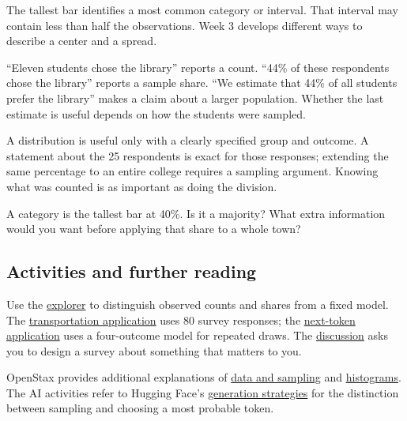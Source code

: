\documentclass[12pt,letterpaper]{article}
\begin{document}
The tallest bar identifies a most common category or interval. That interval may contain less than half the observations. Week 3 develops different ways to describe a center and a spread.


\begin{tcolorbox}[title={What a survey result tells us},breakable,colback=warm,colbacktitle=warm,coltitle=gold,colframe=gold!35]

``Eleven students chose the library'' reports a count. ``44\% of these respondents chose the library'' reports a sample share. ``We estimate that 44\% of all students prefer the library'' makes a claim about a larger population. Whether the last estimate is useful depends on how the students were sampled.


\end{tcolorbox}

A distribution is useful only with a clearly specified group and outcome. A statement about the 25 respondents is exact for those responses; extending the same percentage to an entire college requires a sampling argument. Knowing what was counted is as important as doing the division.


\begin{tcolorbox}[title={Pause and try 12},breakable]
A category is the tallest bar at 40\%. Is it a majority? What extra information would you want before applying that share to a whole town?
\end{tcolorbox}

\subsection*{Activities and further reading}
Use the \href{https://bobovski66.github.io/MathInSociety/demos/probability_distribution.html}{explorer} to distinguish observed counts and shares from a fixed model. The \href{https://bobovski66.github.io/MathInSociety/applications/week2_application.html}{transportation application} uses 80 survey responses; the \href{https://bobovski66.github.io/MathInSociety/applications/week2_ai.html}{next-token application} uses a four-outcome model for repeated draws. The \href{https://bobovski66.github.io/MathInSociety/discussions/week2_discussion.html}{discussion} asks you to design a survey about something that matters to you.

OpenStax provides additional explanations of \href{https://openstax.org/books/introductory-statistics-2e/pages/1-2-data-sampling-and-variation-in-data-and-sampling}{data and sampling} and \href{https://openstax.org/books/introductory-statistics-2e/pages/2-2-histograms-frequency-polygons-and-time-series-graphs}{histograms}. The AI activities refer to Hugging Face's \href{https://huggingface.co/docs/transformers/generation_strategies}{generation strategies} for the distinction between sampling and choosing a most probable token.
\end{document}
